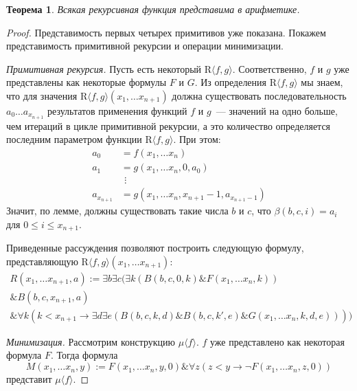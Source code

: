 \documentclass[a4paper,11pt]{article}
\newtheorem{thm}{Теорема}[section]
\theoremstyle{definition}
\newcommand{\amp}{\mathbin{\&}}
\newcommand{\Rr}[1]{\mathrm{R}\langle #1\rangle}
\newcommand{\Mn}[1]{\mu\langle #1\rangle}
\begin{document}
\begin{thm}
Всякая рекурсивная функция представима в арифметике.
\end{thm}
\begin{proof}
Представимость первых четырех примитивов уже показана. Покажем представимость
примитивной рекурсии и операции минимизации.

\emph{Примитивная рекурсия.} Пусть есть некоторый $\Rr{f, g}$. Соответственно,
$f$ и $g$ уже представлены как некоторые формулы $F$ и $G$. Из определения
$\Rr{f, g}$ мы знаем, что для значения $\Rr{f, g}(x_1, \dots x_{n+1})$ должна
существовать последовательность $a_0 \dots a_{x_{n+1}}$ результатов применения
функций $f$ и $g$~--- значений на одно больше, чем итераций в цикле примитивной
рекурсии, а это количество определяется последним параметром функции $\Rr{f,
g}$. При этом:
\begin{align*}
a_0 &= f(x_1, \dots x_n)\\
a_1 &= g(x_1, \dots x_n, 0, a_0)\\
&\ \,\vdots\\
a_{x_{n+1}} &= g(x_1, \dots x_n, x_{n+1} - 1, a_{x_{n+1}-1})
\end{align*}
Значит, по лемме, должны существовать такие числа $b$ и $c$, что $\beta(b, c, i)
= a_i$ для $0 \le i \le x_{n+1}$.

Приведенные рассуждения позволяют построить следующую формулу, представляющую
$\Rr{f, g}(x_1, \dots x_{n+1})$:
\begin{multline*}
R(x_1, \dots x_{n+1}, a) := \exists b\exists c(\exists k(B(b, c, 0, k) \amp F(x_1, \dots x_n, k))\\
\amp B(b, c, x_{n+1}, a)\\
\amp \forall k(k < x_{n+1} \to \exists d\exists e(B(b, c, k, d) \amp B(b, c, k', e) \amp G(x_1, \dots x_n, k, d, e))))
\end{multline*}

\emph{Минимизация.} Рассмотрим конструкцию $\Mn{f}$. $f$ уже представлено как
некоторая формула $F$. Тогда формула
\[ M(x_1, \dots x_n, y) := F(x_1, \dots x_n, y, 0) \amp \forall z(z < y \to \neg F(x_1, \dots x_n, z, 0)) \]
представит $\Mn{f}$.
\end{proof}
\end{document}
